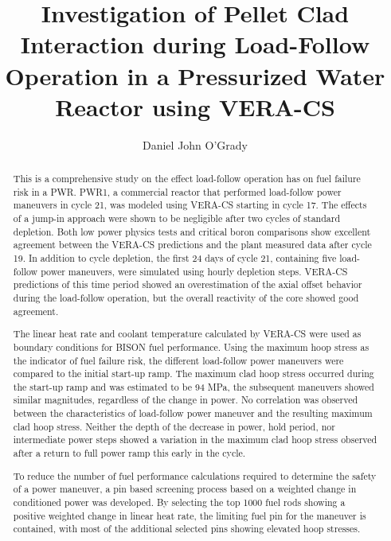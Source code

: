 \documentclass[edeposit,fullpage,11pt]{uiucthesis2009}
\begin{document}
\title{Investigation of Pellet Clad Interaction during Load-Follow\\
       Operation in a Pressurized Water Reactor using VERA-CS}
\author{Daniel John O'Grady}
\msthesis
{}
\maketitle

\frontmatter

\begin{abstract}
This is a comprehensive study on the effect load-follow operation has on fuel failure risk in a PWR. 
PWR1, a commercial reactor that performed load-follow power maneuvers in cycle 21, was modeled using VERA-CS starting in cycle 17. 
The effects of a jump-in approach were shown to be negligible after two cycles of standard depletion.
 Both low power physics tests and critical boron comparisons show excellent agreement between the VERA-CS predictions and the plant measured data after cycle 19.
In addition to cycle depletion, the first 24 days of cycle 21, containing five load-follow power maneuvers, were simulated using hourly depletion steps. 
VERA-CS predictions of this time period showed an overestimation of the axial offset behavior during the load-follow operation, but the overall reactivity of the core showed good agreement.

The linear heat rate and coolant temperature calculated by VERA-CS were used as boundary conditions for BISON fuel performance.
Using the maximum hoop stress as the indicator of fuel failure risk, the different load-follow power maneuvers were compared to the initial start-up ramp.
The maximum clad hoop stress occurred during the start-up ramp and was estimated to be 94 MPa, the subsequent maneuvers showed similar magnitudes, regardless of the change in power. 
No correlation was observed between the characteristics of load-follow power maneuver and the resulting maximum clad hoop stress. 
Neither the depth of the decrease in power, hold period, nor intermediate power steps showed a variation in the maximum clad hoop stress observed after a return to full power ramp this early in the cycle.

To reduce the number of fuel performance calculations required to determine the safety of a power maneuver, a pin based screening process based on a weighted change in conditioned power was developed.
By selecting the top 1000 fuel rods showing a positive weighted change in linear heat rate, the limiting fuel pin for the maneuver is contained, with most of the additional selected pins showing elevated hoop stresses. 
\end{abstract}
\end{document}
